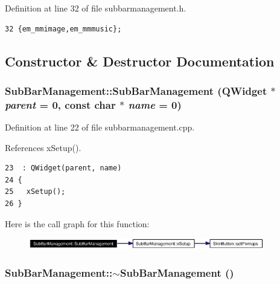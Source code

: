 Definition at line 32 of file subbarmanagement.h.



\footnotesize\begin{verbatim}32 {em_mmimage,em_mmmusic};
\end{verbatim}\normalsize 


\subsection{Constructor \& Destructor Documentation}
\subsubsection{\setlength{\rightskip}{0pt plus 5cm}Sub\-Bar\-Management::Sub\-Bar\-Management ({\bf QWidget} $\ast$ {\em parent} = 0, const char $\ast$ {\em name} = 0)}\label{classSubBarManagement_SubBarManagementa0}




Definition at line 22 of file subbarmanagement.cpp.

References x\-Setup().



\footnotesize\begin{verbatim}23  : QWidget(parent, name)
24 {
25   xSetup();
26 }
\end{verbatim}\normalsize 


Here is the call graph for this function:\begin{figure}[H]
\begin{center}
\leavevmode
\includegraphics[width=292pt]{classSubBarManagement_SubBarManagementa0_cgraph}
\end{center}
\end{figure}
\subsubsection{\setlength{\rightskip}{0pt plus 5cm}Sub\-Bar\-Management::$\sim${\bf Sub\-Bar\-Management} ()}\label{classSubBarManagement_SubBarManagementa1}




